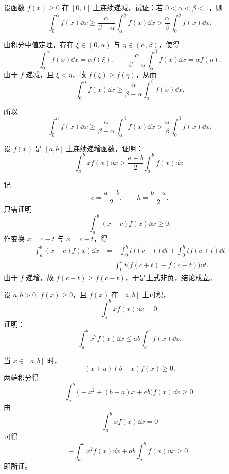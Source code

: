 \begin{problem}
	设函数 $f(x)\geq0$ 在 $[0,1]$ 上连续递减，试证：若 $0<\alpha<\beta<1$，则
	\[
	\int_0^\alpha f(x)\dd x
	\geq
	\frac{\alpha}{\beta-\alpha}\int_\alpha^\beta f(x)\dd x
	>
	\frac{\alpha}{\beta}\int_0^\beta f(x)\dd x.
	\]
\end{problem}

\begin{solution}
	由积分中值定理，存在 $\xi\in(0,\alpha)$ 与 $\eta\in(\alpha,\beta)$，使得
	\[
	\int_0^\alpha f(x)\dd x=\alpha f(\xi),\qquad
	\frac{\alpha}{\beta-\alpha}\int_\alpha^\beta f(x)\dd x=\alpha f(\eta).
	\]
	由于 $f$ 递减，且 $\xi<\eta$，故 $f(\xi)\geq f(\eta)$，从而
	\[
	\int_0^\alpha f(x)\dd x
	\geq
	\frac{\alpha}{\beta-\alpha}\int_\alpha^\beta f(x)\dd x.
	\]

	所以
\[
\int_0^\alpha f(x)\dd x
\geq
\frac{\alpha}{\beta-\alpha}\int_\alpha^\beta f(x)\dd x
>
\frac{\alpha}{\beta}\int_0^\beta f(x)\dd x.
\]
\end{solution}

\begin{problem}
	设 $f(x)$ 是 $[a,b]$ 上连续递增函数，证明：
	\[
	\int_a^b x f(x)\dd x
	\geq
	\frac{a+b}{2}\int_a^b f(x)\dd x.
	\]
\end{problem}

\begin{solution}
	记
	\[
	c=\frac{a+b}{2},\qquad h=\frac{b-a}{2}.
	\]
	只需证明
	\[
	\int_a^b (x-c)f(x)\dd x\geq0.
	\]
	作变换 $x=c-t$ 与 $x=c+t$，得
	\[
	\begin{aligned}
		\int_a^b (x-c)f(x)\dd x
		&=-\int_0^h t f(c-t)\dd t+\int_0^h t f(c+t)\dd t\\
		&=\int_0^h t\bigl(f(c+t)-f(c-t)\bigr)\dd t.
	\end{aligned}
	\]
	由于 $f$ 递增，故 $f(c+t)\geq f(c-t)$，于是上式非负，结论成立。
\end{solution}

\begin{problem}
	设 $a,b>0,\ f(x)\geq0$，且 $f(x)$ 在 $[a,b]$ 上可积，
	\[
	\int_{a}^b x f(x)\dd x=0.
	\]
	证明：
	\[
	\int_{a}^b x^2 f(x)\dd x\leq
	ab\int_{a}^b f(x)\dd x.
	\]
\end{problem}

\begin{solution}
	当 $x\in[a,b]$ 时，
	\[
	(x+a)(b-x)f(x)\geq0.
	\]
	两端积分得
	\[
	\int_{a}^b\bigl(-x^2+(b-a)x+ab\bigr)f(x)\dd x\geq0.
	\]
	由
	\[
	\int_{a}^b x f(x)\dd x=0
	\]
	可得
	\[
	-\int_{a}^b x^2 f(x)\dd x
	+ab\int_{a}^b f(x)\dd x\geq0,
	\]
	即所证。
\end{solution}

